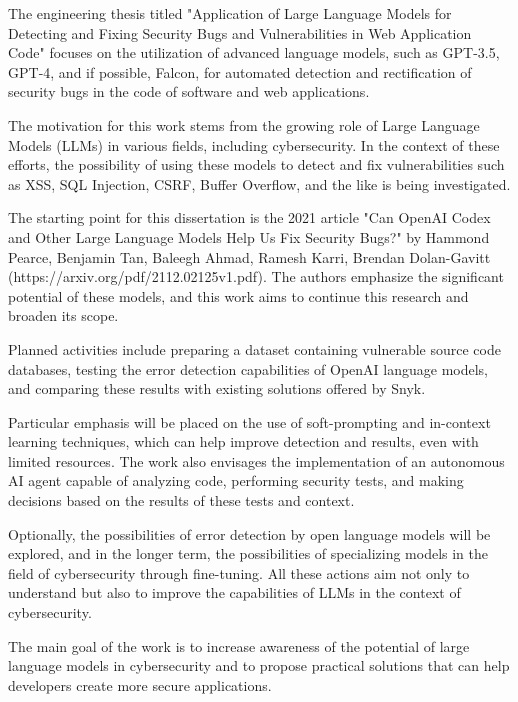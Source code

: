 {}{
The engineering thesis titled "Application of Large Language Models for Detecting and Fixing Security Bugs and Vulnerabilities in Web Application Code" focuses on the utilization of advanced language models, such as GPT-3.5, GPT-4, and if possible, Falcon, for automated detection and rectification of security bugs in the code of software and web applications.

The motivation for this work stems from the growing role of Large Language Models (LLMs) in various fields, including cybersecurity. In the context of these efforts, the possibility of using these models to detect and fix vulnerabilities such as XSS, SQL Injection, CSRF, Buffer Overflow, and the like is being investigated.

The starting point for this dissertation is the 2021 article "Can OpenAI Codex and Other Large Language Models Help Us Fix Security Bugs?" by Hammond Pearce, Benjamin Tan, Baleegh Ahmad, Ramesh Karri, Brendan Dolan-Gavitt (https://arxiv.org/pdf/2112.02125v1.pdf). The authors emphasize the significant potential of these models, and this work aims to continue this research and broaden its scope.

Planned activities include preparing a dataset containing vulnerable source code databases, testing the error detection capabilities of OpenAI language models, and comparing these results with existing solutions offered by Snyk.

Particular emphasis will be placed on the use of soft-prompting and in-context learning techniques, which can help improve detection and results, even with limited resources. The work also envisages the implementation of an autonomous AI agent capable of analyzing code, performing security tests, and making decisions based on the results of these tests and context.

Optionally, the possibilities of error detection by open language models will be explored, and in the longer term, the possibilities of specializing models in the field of cybersecurity through fine-tuning. All these actions aim not only to understand but also to improve the capabilities of LLMs in the context of cybersecurity.

The main goal of the work is to increase awareness of the potential of large language models in cybersecurity and to propose practical solutions that can help developers create more secure applications.

}